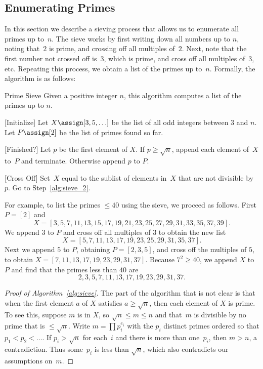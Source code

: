 \subsection{Enumerating Primes}\label{sec:enum_primes}
In this section we describe a sieving process that allows us to
enumerate all primes up to~$n$.  The sieve works by first writing down
all numbers up to $n$, noting that~$2$ is prime, and crossing off all
multiples of~$2$.  Next, note that the first number not crossed off
is~$3$, which is prime, and cross off all multiples of~$3$, etc.
Repeating this process, we obtain a list of the primes up to~$n$.
Formally, the algorithm is as follows:
\begin{algorithm}{Prime Sieve}\label{alg:sieve}
Given a positive integer $n$, this algorithm computes a list of the
primes up to $n$.
\begin{steps}
\item{}[Initialize] Let $X\assign [3,5,\ldots]$ be the list
of all odd integers between $3$ and $n$.  Let $P\assign [2]$ be the list
of primes found so far.
\item{}[Finished?]\label{alg:sieve_2}
Let $p$ be the first element of $X$.
If $p\geq \sqrt{n}$, append each element of~$X$
to~$P$ and terminate.   Otherwise append $p$ to $P$.
\item{}[Cross Off]
Set~$X$ equal to the sublist of elements in~$X$ that
are not divisible by~$p$.
Go to Step~\ref{alg:sieve_2}.
\end{steps}
\end{algorithm}
For example, to list the primes $\leq 40$ using the sieve, we
proceed as follows.  First $P=[2]$ and
$$X = [3,5,7,11,13,15,17,19,21,23,25,27,29,31,33,35,37,39].$$
We append $3$ to $P$ and cross off all multiples of $3$ to obtain
the new list
$$X = [5,7,11,13,17,19,23,25,29,31,35,37].$$
Next we append $5$ to $P$, obtaining $P=[2,3,5]$, and cross off
the multiples of $5$, to obtain $X = [7,11,13,17,19,23,29,31,37].$
Because $7^2\geq 40$, we append $X$ to $P$ and find that the
primes less than $40$ are
$$
  2,3,5, 7,11,13,17,19,23,29,31,37.
$$
\begin{proof}[Proof of Algorithm~\ref{alg:sieve}]
The part of the algorithm that is not clear is that
when the first element $a$ of $X$ satisfies $a\geq \sqrt{n}$,
then each element of $X$ is prime.
To see this, suppose $m$ is in $X$, so
$\sqrt{n} \leq m\leq n$ and that~$m$ is divisible by
no prime that is $\leq \sqrt{n}$.  Write $m=\prod p_i^{e_i}$ with
the $p_i$ distinct primes ordered so that $p_1<p_2<\ldots$.  If $p_i>\sqrt{n}$
for each~$i$ and there is more than one~$p_i$, then $m>n$,
a contradiction.  Thus some~$p_i$ is less than $\sqrt{n}$,
which also contradicts our assumptions on~$m$.
\end{proof}


